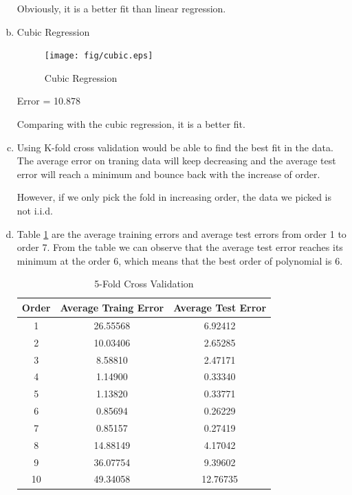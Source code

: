 \documentclass[a4paper, 12pt, titlepage]{article}
\begin{document}
\begin{enumerate}[(a)]
            Obviously, it is a better fit than linear regression.

        \item Cubic Regression %
            \begin{figure}[H]
                \centering
                \texttt{[image: fig/cubic.eps]}
                \caption{Cubic Regression}\label{f}
            \end{figure}

            Error = 10.878

            Comparing with the cubic regression, it is a better fit.

        \item %
            Using K-fold cross validation would be able to find the best fit in the data. The average error on traning data will keep decreasing and the average test error will reach a minimum and bounce back with the increase of order.

            However, if we only pick the fold in increasing order, the data we picked is not i.i.d.

        \item Table \ref{CrossValid} are the average training errors and average test errors from order 1 to order 7. From the table we can observe that the average test error reaches its minimum at the order 6, which means that the best order of polynomial is 6.
            \begin{table}[H]
                \centering
                \begin{tabular}{ccc}
                Order & Average Traing Error & Average Test Error \\
                    \hline
                1 & 26.55568 & 6.92412 \\
                2 & 10.03406 & 2.65285 \\
                3 & 8.58810  & 2.47171 \\
                4 & 1.14900  & 0.33340 \\
                5 & 1.13820  & 0.33771 \\
                6 & 0.85694  & 0.26229 \\
                7 & 0.85157  & 0.27419 \\
                8 & 14.88149  & 4.17042\\
                9 & 36.07754  & 9.39602 \\
                10 & 49.34058  & 12.76735 \\
                \end{tabular}
                \caption{5-Fold Cross Validation}
                \label{CrossValid}
            \end{table}


\end{enumerate}
\end{document}
